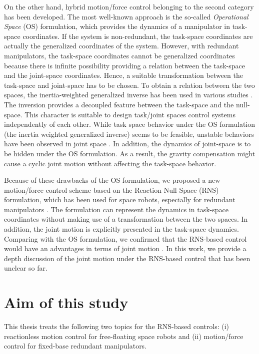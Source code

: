 On the other hand,
hybrid motion/force control belonging
to the second category has been developed.
The most well-known approach is the so-called \textit{Operational Space} (OS) formulation,
which provides the dynamics of a manipulator in task-space coordinates.
If the system is non-redundant,
the task-space coordinates are actually the generalized coordinates of the system.
However, with redundant manipulators,
the task-space coordinates cannot be generalized coordinates because there is infinite possibility
providing a relation between the task-space and the joint-space coordinates.
Hence, a suitable transformation between the task-space and joint-space has to be chosen.
To obtain a relation between the two spaces,
the inertia-weighted generalized inverse has been used in various studies \cite{Khatib1987,Park1999,Ott2008,Nakanishi2008}.
The inversion provides a decoupled feature between the task-space and the null-space.
This character is suitable to design task/joint spaces control systems independently of each other.
While task space behavior under the OS formulation (the inertia weighted generalized inverse) seems to be feasible,
unstable behaviors have been observed in joint space \cite{Hollerbach1985,Hollerbach1987}.
In addition, the dynamics of joint-space is to be hidden under the OS formulation.
As a result, the gravity compensation might cause
a cyclic joint motion without affecting the task-space behavior.

Because of these drawbacks of the OS formulation,
we proposed a new motion/force control scheme based on the Reaction Null Space (RNS) formulation,
which has been used for space robots,
especially for redundant manipulators \cite{Hara2012}.
The formulation can represent the dynamics in task-space coordinates without
making use of a transformation between the two spaces.
In addition, the joint motion is explicitly presented in the task-space dynamics.
Comparing with the OS formulation,
we confirmed that the RNS-based control would have an advantages in terms of joint motion \cite{Hara2012}.
In this work, we provide a depth discussion of the joint motion under the RNS-based control that
has been unclear so far.


\section{Aim of this study}
This thesis treats the following two topics for the RNS-based controls:
(i) reactionless motion control for free-floating space robots and
(ii) motion/force control for fixed-base redundant manipulators.

